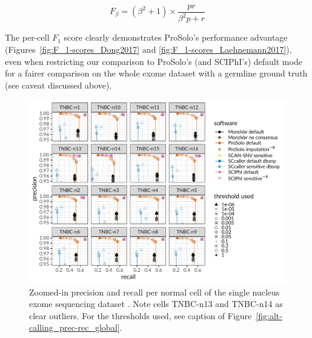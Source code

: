 \documentclass[authoryear,preprint,11pt]{scrartcl}
\begin{document}
\begin{equation} \label{eq:F_1_score}
  F_{\beta} = (\beta^2 + 1) \times \frac{p r}{\beta^2 p + r}
\end{equation}

The per-cell $F_1$ score clearly demonstrates ProSolo's performance advantage (Figures~\ref{fig:F_1-scores_Dong2017} and \ref{fig:F_1-scores_Laehnemann2017}), even when restricting our comparison to ProSolo's (and SCIPhI's) default mode for a fairer comparison on the whole exome dataset with a germline ground truth (see caveat discussed above).

\begin{figure}[!tpb]
 \begin{minipage}{\linewidth}
  \includegraphics[width=\linewidth]{figs/Wang2014/Wang2014_prosolo-monovar-scansnv-sccaller-scvilp_per-cell_precision-recall-plot_focus-tools_normal.pdf} \newline
 \end{minipage}
 \caption{
  Zoomed-in precision and recall per normal cell of the single nucleus exome sequencing dataset \cite{wang_clonal_2014}.
  Note cells TNBC-n13 and TNBC-n14 as clear outliers.\newline \footnotesize
  For the thresholds used, see caption of Figure~\ref{fig:alt-calling_prec-rec_global}.
  }
 \label{fig:wang_alt-calling_prec-rec_per-cell_normal}
\end{figure}
\end{document}
